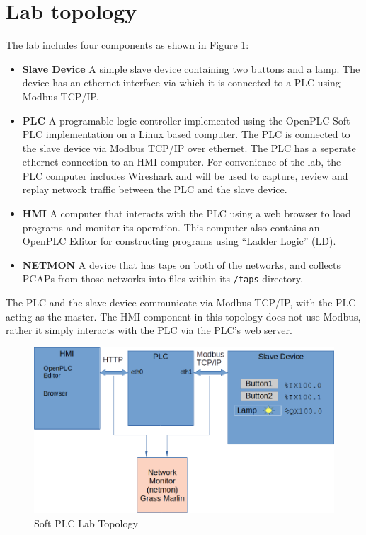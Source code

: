 \section{Lab topology}
The lab includes four components as shown in Figure \ref{fig:topology}:
\begin{itemize}
\item \textbf{Slave Device} A simple slave device containing two buttons and a lamp.  The device has an
ethernet interface via which it is connected to a PLC using Modbus TCP/IP.
\item \textbf{PLC} A programable logic controller implemented using the OpenPLC Soft-PLC implementation
on a Linux based computer.  The PLC is connected to the slave device via Modbus TCP/IP over ethernet.
The PLC has a seperate ethernet connection to an HMI computer.
For convenience of the lab, the PLC computer includes Wireshark and will be used to capture, review and
replay network traffic between the PLC and the slave device.  

\item \textbf{HMI} A computer that interacts with the PLC using a web browser to load programs and monitor its operation.  This
computer also contains an OpenPLC Editor for constructing programs using ``Ladder Logic'' (LD).

\item \textbf{NETMON} A device that has taps on both of the networks, and collects PCAPs from those networks into files within its {\tt /taps} 
directory.
\end{itemize}

The PLC and the slave device communicate via Modbus TCP/IP, with the PLC acting as the master.  
The HMI component in this topology does not use Modbus, rather it simply interacts with the PLC via the
PLC's web server.
\begin{figure}[H]
\begin{center}
\includegraphics [width=0.8\linewidth]{plc-traffic.png}
\end{center}
\caption{Soft PLC Lab Topology}
\label{fig:topology}
\end{figure}


